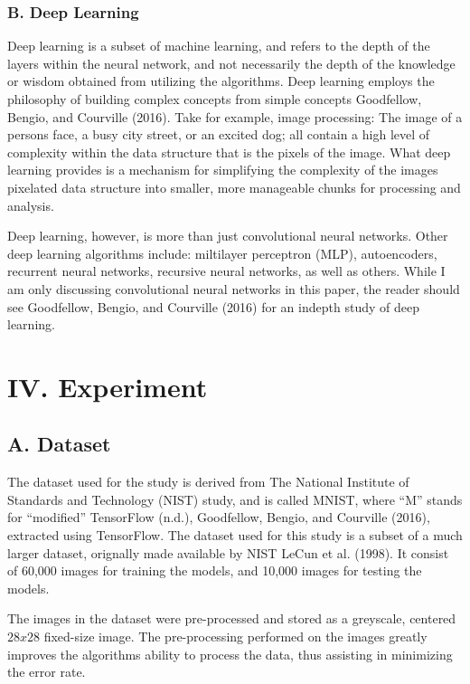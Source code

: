 \documentclass[conference,final,]{IEEEtran}
\begin{document}
\subsubsection{B. Deep Learning}\label{b.-deep-learning}

Deep learning is a subset of machine learning, and refers to the depth
of the layers within the neural network, and not necessarily the depth
of the knowledge or wisdom obtained from utilizing the algorithms. Deep
learning employs the philosophy of building complex concepts from simple
concepts Goodfellow, Bengio, and Courville (2016). Take for example,
image processing: The image of a persons face, a busy city street, or an
excited dog; all contain a high level of complexity within the data
structure that is the pixels of the image. What deep learning provides
is a mechanism for simplifying the complexity of the images pixelated
data structure into smaller, more manageable chunks for processing and
analysis.

Deep learning, however, is more than just convolutional neural networks.
Other deep learning algorithms include: miltilayer perceptron (MLP),
autoencoders, recurrent neural networks, recursive neural networks, as
well as others. While I am only discussing convolutional neural networks
in this paper, the reader should see Goodfellow, Bengio, and Courville
(2016) for an indepth study of deep learning.

\section{IV. Experiment}\label{iv.-experiment}

\subsection{A. Dataset}\label{a.-dataset}

The dataset used for the study is derived from The National Institute of
Standards and Technology (NIST) study, and is called MNIST, where ``M''
stands for ``modified'' TensorFlow (n.d.), Goodfellow, Bengio, and
Courville (2016), extracted using TensorFlow. The dataset used for this
study is a subset of a much larger dataset, orignally made available by
NIST LeCun et al. (1998). It consist of 60,000 images for training the
models, and 10,000 images for testing the models.

The images in the dataset were pre-processed and stored as a greyscale,
centered \(28x28\) fixed-size image. The pre-processing performed on the
images greatly improves the algorithms ability to process the data, thus
assisting in minimizing the error rate.
\end{document}
